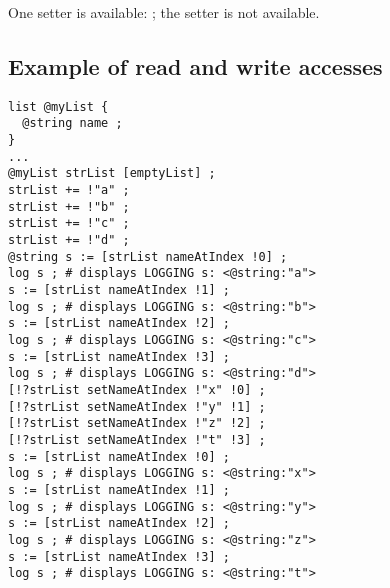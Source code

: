 One setter is available: ; the  setter is not available.

\subsection{Example of read and write accesses}

\begin{lstlisting}[language=galgas]
list @myList {
  @string name ;
}
...
@myList strList [emptyList] ;
strList += !"a" ;
strList += !"b" ;
strList += !"c" ;
strList += !"d" ;
@string s := [strList nameAtIndex !0] ;
log s ; # displays LOGGING s: <@string:"a">
s := [strList nameAtIndex !1] ;
log s ; # displays LOGGING s: <@string:"b">
s := [strList nameAtIndex !2] ;
log s ; # displays LOGGING s: <@string:"c">
s := [strList nameAtIndex !3] ;
log s ; # displays LOGGING s: <@string:"d">
[!?strList setNameAtIndex !"x" !0] ;
[!?strList setNameAtIndex !"y" !1] ;
[!?strList setNameAtIndex !"z" !2] ;
[!?strList setNameAtIndex !"t" !3] ;
s := [strList nameAtIndex !0] ;
log s ; # displays LOGGING s: <@string:"x">
s := [strList nameAtIndex !1] ;
log s ; # displays LOGGING s: <@string:"y">
s := [strList nameAtIndex !2] ;
log s ; # displays LOGGING s: <@string:"z">
s := [strList nameAtIndex !3] ;
log s ; # displays LOGGING s: <@string:"t">
\end{lstlisting}
